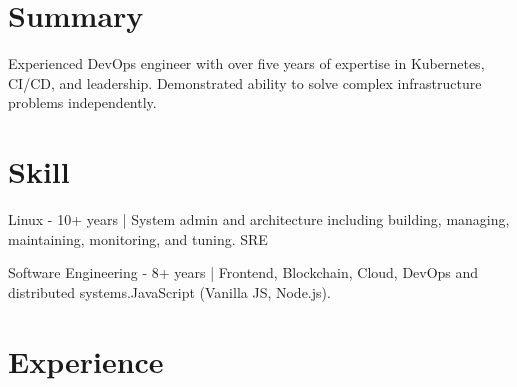 \documentclass[]{deedy-resume-openfont}
\begin{document}
%
%
\lastupdated

%
%

%
%

\begin{minipage}[t]{1\textwidth}



\section{Summary}
\begin{summary}
  Experienced DevOps engineer with over five years of expertise in Kubernetes, CI/CD, and leadership. Demonstrated ability to solve complex infrastructure problems independently.
\end{summary}

\section{Skill}
\vspace{\topsep}
\begin{tightemize}
    \item Linux - 10+ years | System admin and architecture including building, managing, maintaining, monitoring, and tuning. SRE
    \item Software Engineering - 8+ years | Frontend, Blockchain, Cloud, DevOps and distributed systems.JavaScript (Vanilla JS, Node.js).
\end{tightemize}






\section{Experience}


\end{minipage}
\end{document}
